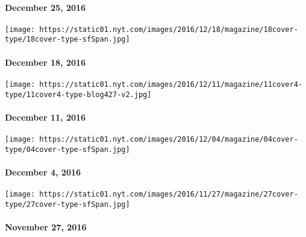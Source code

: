 \hypertarget{december-25-2016}{%
\paragraph{December 25, 2016}\label{december-25-2016}}

\href{http://www.nytimes.com/indexes/2016/12/18/magazine/index.html}{}

\texttt{[image: https://static01.nyt.com/images/2016/12/18/magazine/18cover-type/18cover-type-sfSpan.jpg]}

\hypertarget{december-18-2016}{%
\paragraph{December 18, 2016}\label{december-18-2016}}

\href{http://www.nytimes.com/indexes/2016/12/11/magazine/index.html}{}

\texttt{[image: https://static01.nyt.com/images/2016/12/11/magazine/11cover4-type/11cover4-type-blog427-v2.jpg]}

\hypertarget{december-11-2016}{%
\paragraph{December 11, 2016}\label{december-11-2016}}

\href{http://www.nytimes.com/indexes/2016/12/04/magazine/index.html}{}

\texttt{[image: https://static01.nyt.com/images/2016/12/04/magazine/04cover-type/04cover-type-sfSpan.jpg]}

\hypertarget{december-4-2016}{%
\paragraph{December 4, 2016}\label{december-4-2016}}

\href{http://www.nytimes.com/indexes/2016/11/27/magazine/index.html}{}

\texttt{[image: https://static01.nyt.com/images/2016/11/27/magazine/27cover-type/27cover-type-sfSpan.jpg]}

\hypertarget{november-27-2016}{%
\paragraph{November 27, 2016}\label{november-27-2016}}

\href{http://www.nytimes.com/indexes/2016/11/20/magazine/index.html}{}

